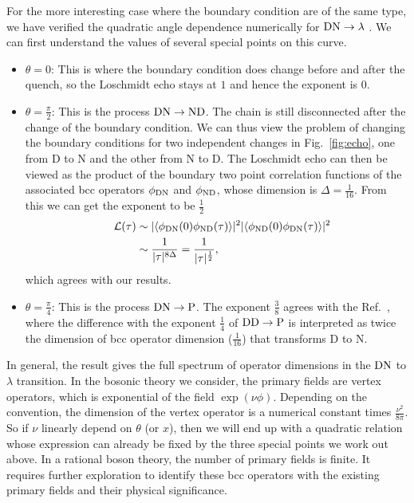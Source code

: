 For the more interesting case where the boundary condition are of the same type, we have verified the quadratic angle dependence numerically for ${\rm DN} \rightarrow \lambda$ {\iffalse \color{red}the process in Eq.~\eqref{eq:DNDN}.\fi}. We can first understand the values of several special points on this curve. 
\begin{itemize}
\item $\theta = 0$: This is where the boundary condition does change before and after the quench, so the Loschmidt echo stays at $1$ and hence the exponent is $0$.
\item $\theta = \frac{\pi}{2}$: This is the process ${\rm DN}\rightarrow {\rm  ND}$. The chain is still disconnected after the change of the boundary condition. We can thus view the problem of changing the boundary conditions for two independent changes in Fig.~\ref{fig:echo}, one from D to N and the other from N to D. The Loschmidt echo can then be viewed as the product of the boundary two point correlation functions of the associated bcc operators $\phi_{\rm DN}$ and $\phi_{\rm ND}$, whose dimension is $\Delta = \frac{1}{16}$. From this we can get the exponent to be $\frac{1}{2}$
\begin{equation}
\begin{aligned}
  \quad \mathcal{L}(\tau) &\sim |\langle \phi_{{\rm D N}}(0) \phi_{{\rm ND}}(\tau)   \rangle |^2 
|\langle \phi_{{\rm ND}}(0)  \phi_{{\rm DN}}(\tau)   \rangle| ^2\\
& \sim \frac{1}{|\tau|^{8\Delta}} = \frac{1}{|\tau|^{\frac{1}{2}}},
\end{aligned}
\end{equation}
which agrees with our results. 
\item $\theta = \frac{\pi}{4}$: This is the process ${\rm DN}\rightarrow {\rm P}$. The exponent $\frac{3}{8}$ agrees with the Ref.~, where the difference with the exponent $\frac{1}{4}$ of ${\rm DD} \rightarrow {\rm P}$ is interpreted as twice the dimension of bcc operator dimension ($\frac{1}{16}$) that transforms D to N.
\end{itemize}
In general, the result gives the full spectrum of operator dimensions in the ${\rm DN}$ to $\lambda $ transition. In the bosonic theory we consider, the primary fields are vertex operators, which is exponential of the field $\exp( \nu \phi )$. Depending on the convention, the dimension of the vertex operator is a numerical constant times $\frac{\nu^2}{8\pi}$. So if $\nu$ linearly depend on $\theta$ (or $x$), then we will end up with a quadratic relation whose expression can already be fixed by the three special points we work out above. In a rational boson theory, the number of primary fields is finite. It requires further exploration to identify these bcc operators with the existing primary fields and their physical significance. 

